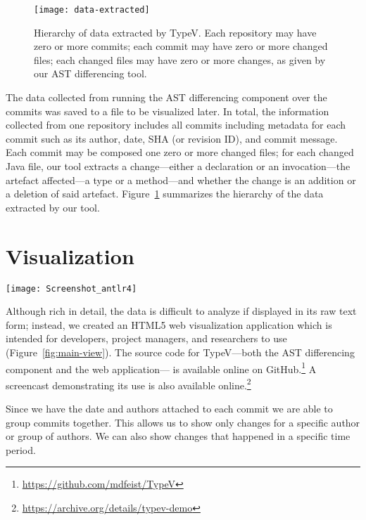 \begin{figure}[h]
\centering
\texttt{[image: data-extracted]}
\caption{Hierarchy of data extracted by TypeV. Each repository may have zero or more commits; each commit may have zero or more changed files; each changed files may have zero or more changes, as given by our AST differencing tool.}
\label{fig:data-extracted}
\end{figure}

The data collected from running the AST differencing component over the commits was saved to a file to be visualized later. In total, the information collected from one repository includes all commits including metadata for each commit such as its author, date, SHA (or revision ID), and commit message. Each commit may be composed one zero or more changed files; for each changed Java file, our tool extracts a change---either a declaration or an invocation---the artefact affected---a type or a method---and whether the change is an addition or a deletion of said artefact. Figure~\ref{fig:data-extracted} summarizes the hierarchy of the data extracted by our tool.

\section{Visualization}

\begin{figure*}[!t]
\centering
\texttt{[image: Screenshot\_antlr4]}
\caption{Screenshot showing the main view for TypeV. The data being displayed is from the ANTLR4 repository. Light blue bars \additionsbox{10pt} indicate \textbf{additions}; dark red bars \deletionsbox{10pt} indicate \textbf{deletions}.}
\label{fig:main-view}
\end{figure*}

Although rich in detail, the data is difficult to analyze if displayed in its raw text form; instead, we created an HTML5 web visualization application which is intended for developers, project managers, and researchers to use (Figure~\ref{fig:main-view}). The source code for TypeV---both the AST differencing component and the web application--- is available online on GitHub.\footnote{\url{https://github.com/mdfeist/TypeV}} A screencast demonstrating its use is also available online.\footnote{\url{https://archive.org/details/typev-demo}}

Since we have the date and authors attached to each commit we are able to group commits together. This allows us to show only changes for a specific author or group of authors. We can also show changes that happened in a specific time period.

